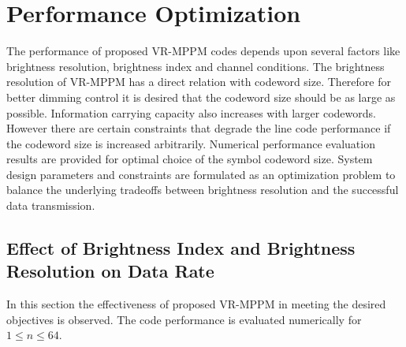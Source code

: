 \chapter{Performance Optimization} %
\label{Chapter5}



The performance of proposed VR-MPPM codes depends upon several factors like brightness resolution, brightness index and channel conditions. The brightness resolution of VR-MPPM has a direct relation with codeword size. Therefore for better dimming control it is desired that the codeword size should be as large as possible. Information carrying capacity also increases with larger codewords. However there are certain constraints that degrade the line code performance if the codeword size is increased arbitrarily. Numerical performance evaluation results are provided for optimal choice of the symbol codeword size. System design parameters and constraints are formulated as an optimization problem to balance the underlying tradeoffs between brightness resolution and the successful data transmission. 

\section{Effect of Brightness Index and Brightness Resolution on Data Rate}


In this section the effectiveness of proposed VR-MPPM in meeting the desired objectives is observed. The code performance is evaluated numerically for $1 \leq n \leq64$. 

